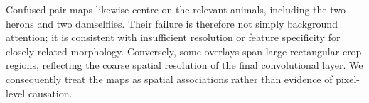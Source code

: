 Confused-pair maps likewise centre on the relevant animals, including the two
herons and two damselflies.  Their failure is therefore not simply background
attention; it is consistent with insufficient resolution or feature
specificity for closely related morphology.  Conversely, some overlays span
large rectangular crop regions, reflecting the coarse spatial resolution of
the final convolutional layer.  We consequently treat the maps as spatial
associations rather than evidence of pixel-level causation.
